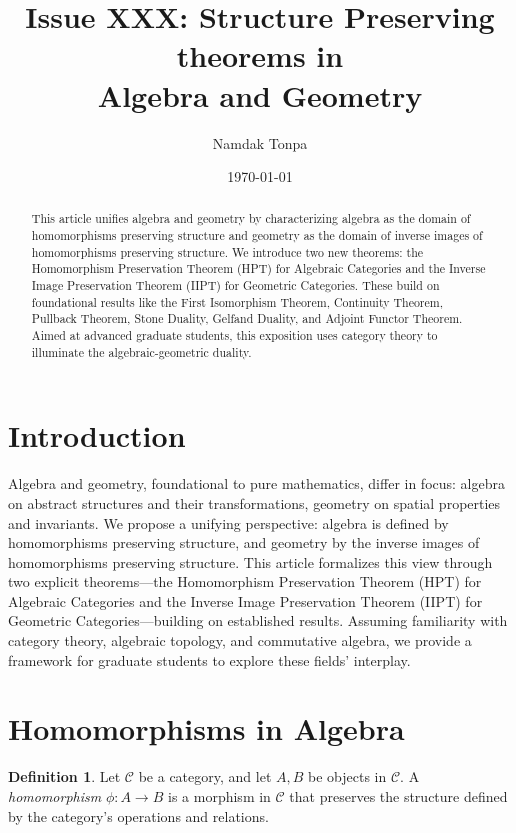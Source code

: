\documentclass{article}
\title{Issue XXX: Structure Preserving theorems in \\ Algebra and Geometry}
\author{Namdak Tonpa}
\date{\today}
\theoremstyle{plain}
\theoremstyle{definition}
\newtheorem{definition}{Definition}
\begin{document}
\maketitle

\begin{abstract}
This article unifies algebra and geometry by characterizing algebra
as the domain of homomorphisms preserving structure and geometry
as the domain of inverse images of homomorphisms preserving structure.
We introduce two new theorems: the Homomorphism Preservation Theorem (HPT)
for Algebraic Categories and the Inverse Image Preservation Theorem (IIPT)
for Geometric Categories. These build on foundational results like the
First Isomorphism Theorem, Continuity Theorem, Pullback Theorem,
Stone Duality, Gelfand Duality, and Adjoint Functor Theorem.
Aimed at advanced graduate students, this exposition uses category
theory to illuminate the algebraic-geometric duality.
\end{abstract}

\section{Introduction}
Algebra and geometry, foundational to pure mathematics, differ in focus: algebra on abstract structures and their transformations, geometry on spatial properties and invariants. We propose a unifying perspective: algebra is defined by homomorphisms preserving structure, and geometry by the inverse images of homomorphisms preserving structure. This article formalizes this view through two explicit theorems—the Homomorphism Preservation Theorem (HPT) for Algebraic Categories and the Inverse Image Preservation Theorem (IIPT) for Geometric Categories—building on established results. Assuming familiarity with category theory, algebraic topology, and commutative algebra, we provide a framework for graduate students to explore these fields’ interplay.

\section{Homomorphisms in Algebra}
\begin{definition}
Let \(\mathcal{C}\) be a category, and let \(A, B\) be objects in \(\mathcal{C}\). A \emph{homomorphism} \(\phi: A \to B\) is a morphism in \(\mathcal{C}\) that preserves the structure defined by the category’s operations and relations.
\end{definition}
\end{document}
